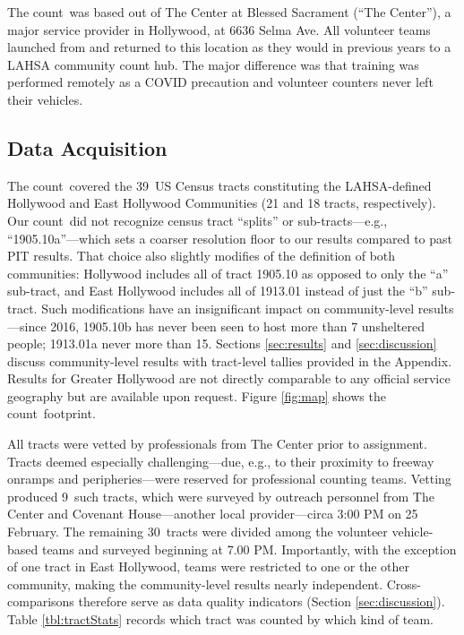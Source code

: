 \documentclass[11pt,twocolumn]{article}
\def\Count{count}
\def\ntracts{39}
\def\nprof{9}
\def\nvol{30}
\def\resp{respectively}
\begin{document}
The \Count\ was based out of The Center at Blessed Sacrament (``The Center''), a major service 
provider in Hollywood, at 6636 Selma Ave. All volunteer teams launched from and returned to this 
location as they would in previous years to a LAHSA community count hub. The major difference 
was that training was performed remotely as a COVID precaution and volunteer counters never left 
their vehicles.

\subsection{Data Acquisition}
\label{sec:acquisition}

The \Count\ covered the \ntracts\ US Census tracts constituting the LAHSA-defined Hollywood 
and East Hollywood Communities (21 and 18 tracts, \resp). Our \Count\ did not recognize census 
tract ``splits'' or sub-tracts---e.g., ``1905.10a''---which sets a coarser resolution floor to our results 
compared to past PIT results. That choice also slightly modifies of the definition of both communities:
Hollywood includes all of tract 1905.10 as opposed to only the ``a'' sub-tract, and East Hollywood
includes all of 1913.01 instead of just the ``b'' sub-tract. Such modifications have an insignificant impact 
on community-level results---since 2016, 1905.10b has never been seen to host more than 7 
unsheltered people; 1913.01a never more than 15. Sections \ref{sec:results} and \ref{sec:discussion} 
discuss community-level results with tract-level tallies provided in the Appendix. Results for Greater 
Hollywood are not directly comparable to any official service geography but are available upon request. 
Figure \ref{fig:map} shows the \Count\ footprint.

All tracts were vetted by professionals from The Center prior to assignment. Tracts deemed 
especially challenging---due, e.g., to their proximity to freeway onramps and peripheries---were 
reserved for professional counting teams. Vetting produced \nprof\ such tracts, which were surveyed 
by outreach personnel from The Center and Covenant House---another local provider---circa 3:00 PM
on 25 February. The remaining \nvol\ tracts were divided among the volunteer vehicle-based teams 
and surveyed beginning at 7.00 PM. Importantly, with the exception of one tract in East Hollywood, 
teams were restricted to one or the other community, making the community-level results nearly
independent. Cross-comparisons therefore serve as data quality indicators (Section \ref{sec:discussion}). 
Table \ref{tbl:tractStats} records which tract was counted by which kind of team. 
\end{document}
